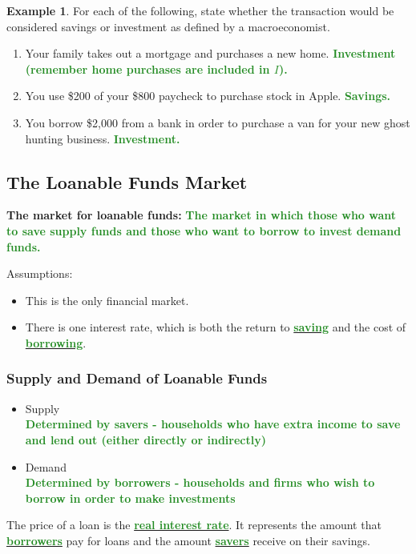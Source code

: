\documentclass[11pt]{article}\usepackage[]{graphicx}\usepackage[]{color}
\theoremstyle{definition}
\newtheorem{exmp}{Example}[section]
\newcommand{\ddp}[1]{{\textbf{\textcolor{ForestGreen}{#1}}}}
\newcommand{\dd}[1]{{\underline{\textbf{\textcolor{ForestGreen}{#1}}}}}
\newcommand{\defn}[1]{\textbf{#1}}
\begin{document}
\begin{exmp} For each of the following, state whether the transaction would be considered savings or investment as defined by a macroeconomist.
	 \begin{enumerate}
	 	\setlength{\itemsep}{1em}
	 	\item Your family takes out a mortgage and purchases a new home. \ddp{Investment (remember home purchases are included in $I$).}
		\item You use \$200 of your \$800 paycheck to purchase stock in Apple. \ddp{Savings.}
		\item You borrow \$2,000 from a bank in order to purchase a van for your new ghost hunting business. \ddp{Investment.}
	\end{enumerate}
\end{exmp}

\subsection{The Loanable Funds Market}

\defn{The market for loanable funds:} \ddp{The market in which those who want to save supply funds and those who want to borrow to invest demand funds.\\}

Assumptions:
\begin{itemize}
	\item This is the only financial market.
	\item There is one interest rate, which is both the return to \dd{saving} and the cost of \dd{borrowing}.
\end{itemize}

\subsubsection*{Supply and Demand of Loanable Funds}

\begin{itemize}
	\setlength{\itemsep}{1em}
	\item Supply 
	\ddp{\\Determined by savers - households who have extra income to save and lend out (either directly or indirectly)}
	\item Demand 
	\ddp{\\Determined by borrowers - households and firms who wish to borrow in order to make investments}
\end{itemize}

The price of a loan is the \dd{real interest rate}. It represents the amount that \dd{borrowers} pay for loans and the amount \dd{savers} receive on their savings.
\\
\end{document}
